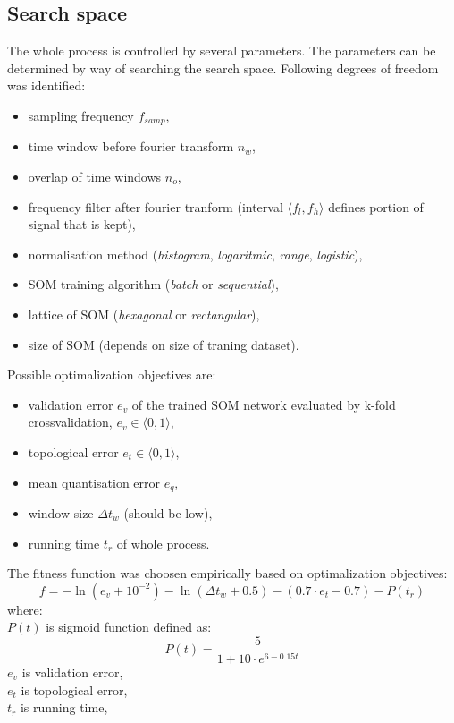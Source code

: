 \documentclass[a4paper]{IEEEtran}
\begin{document}

\subsection{Search space}
The whole process is controlled by several parameters.
The parameters can be determined by way of searching the search space.
Following degrees of freedom was identified:
\begin{itemize}
	\item sampling frequency $ f_{samp} $,
	\item time window before fourier transform $ n_w $,
	\item overlap of time windows $ n_o $,
	\item frequency filter after fourier tranform (interval $ \langle f_l, f_h
	\rangle $ defines portion of signal that is kept),
	\item normalisation method (\textit{histogram}, \textit{logaritmic}, 
	\textit{range}, \textit{logistic}),
	\item SOM training algorithm (\textit{batch} or \textit{sequential}),
	\item lattice of SOM (\textit{hexagonal} or \textit{rectangular}),
	\item size of SOM (depends on size of traning dataset).
\end{itemize}
Possible optimalization objectives are:%
\begin{itemize}
	\item validation error $ e_v $ of the trained SOM network evaluated by k-fold
	crossvalidation, $ e_v \in \langle 0, 1 \rangle $,
	\item topological error $ e_t \in \langle 0, 1 \rangle $,
	\item mean quantisation error $ e_q $,
	\item window size $ \Delta t_w $ (should be low),
	\item running time $ t_r $ of whole process.
\end{itemize}
The fitness function was choosen empirically based on optimalization objectives:
\[ f = -\ln(e_v+10^{-2 }) - \ln(\Delta t_w+0.5) - (0.7\cdot e_t-0.7) - P(t_r) \]
where:\\
$ P(t) $ is sigmoid function defined as:
\[ P(t) = \frac{5}{1+10\cdot e^{6-0.15t}} \]
$ e_v $ is validation error,\\
$ e_t $ is topological error,\\
$ t_r $ is running time,\\
\end{document}
